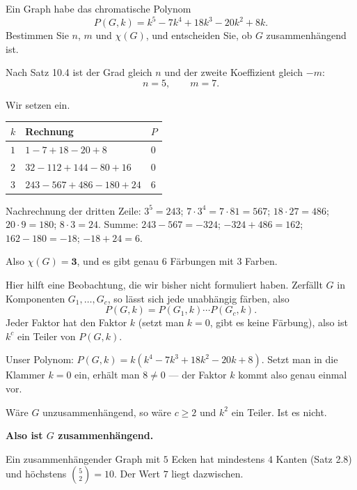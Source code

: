 \begin{aufgabe}
Ein Graph habe das chromatische Polynom
\[ P(G,k) = k^5 - 7k^4 + 18k^3 - 20k^2 + 8k . \]
Bestimmen Sie $n$, $m$ und $\chi(G)$, und entscheiden Sie, ob $G$ zusammenhängend ist.

\loesung
{}
Nach Satz 10.4 ist der Grad gleich $n$ und der zweite Koeffizient gleich $-m$:
\[ n = 5, \qquad m = 7 . \]

Wir setzen ein.
\begin{center}
\renewcommand{\arraystretch}{1.42}
\begin{tabular}{@{}P{1.2cm}P{5.0cm}P{1.4cm}@{}}
\toprule
$k$ & \textbf{Rechnung} & $P$\\
\midrule
$1$ & $1 - 7 + 18 - 20 + 8$ & $0$\\
$2$ & $32 - 112 + 144 - 80 + 16$ & $0$\\
$3$ & $243 - 567 + 486 - 180 + 24$ & $6$\\
\bottomrule
\end{tabular}
\end{center}

Nachrechnung der dritten Zeile: $3^5 = 243$; $7 \cdot 3^4 = 7 \cdot 81 = 567$; $18 \cdot 27 = 486$; $20 \cdot 9 = 180$; $8 \cdot 3 = 24$. Summe: $243 - 567 = -324$; $-324 + 486 = 162$; $162 - 180 = -18$; $-18 + 24 = 6$.

Also $\chi(G) = \mathbf{3}$, und es gibt genau $6$ Färbungen mit $3$ Farben.

Hier hilft eine Beobachtung, die wir bisher nicht formuliert haben. Zerfällt $G$ in Komponenten $G_1, \ldots, G_c$, so lässt sich jede unabhängig färben, also
\[ P(G,k) = P(G_1,k)\cdots P(G_c,k) . \]
Jeder Faktor hat den Faktor $k$ (setzt man $k=0$, gibt es keine Färbung), also ist $k^c$ ein Teiler von $P(G,k)$.

Unser Polynom: $P(G,k) = k(k^4 - 7k^3 + 18k^2 - 20k + 8)$. Setzt man in die Klammer $k=0$ ein, erhält man $8 \neq 0$ --- der Faktor $k$ kommt also genau einmal vor.

Wäre $G$ unzusammenhängend, so wäre $c \ge 2$ und $k^2$ ein Teiler. Ist es nicht.

\textbf{Also ist $G$ zusammenhängend.}

Ein zusammenhängender Graph mit $5$ Ecken hat mindestens $4$ Kanten (Satz 2.8) und höchstens $\binom{5}{2} = 10$. Der Wert $7$ liegt dazwischen. \checkmark

\begin{center}
\begin{minipage}{0.86\textwidth}
\end{minipage}
\end{center}
\end{aufgabe}

